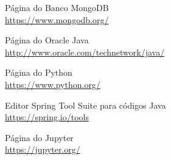 \documentclass[a4paper,11pt]{article}
\begin{document}


\begin{thebibliography}{8}
  Página do Banco MongoDB \\
  \url{https://www.mongodb.org/}

  Página do Oracle Java \\
  \url{http://www.oracle.com/technetwork/java/}
  
  Página do Python \\
  \url{https://www.python.org/}

  Editor Spring Tool Suite para códigos Java \\
  \url{https://spring.io/tools}

  Página do Jupyter \\
  \url{https://jupyter.org/}

  
\end{thebibliography}
  
\end{document}
